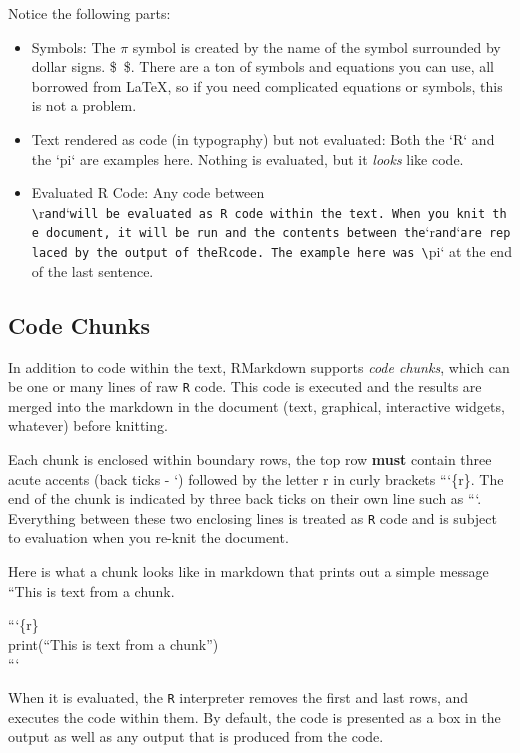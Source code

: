 \documentclass[
  letterpaper,
]{book}
\providecommand{\tightlist}{%
  \setlength{\itemsep}{0pt}\setlength{\parskip}{0pt}}
\begin{document}
Notice the following parts:

\begin{itemize}
\tightlist
\item
  Symbols: The \(\pi\) symbol is created by the name of the symbol
  surrounded by dollar signs. \$~\pi \$. There are a ton of symbols and
  equations you can use, all borrowed from LaTeX, so if you need
  complicated equations or symbols, this is not a problem.
\item
  Text rendered as code (in typography) but not evaluated: Both the `R`
  and the `pi` are examples here. Nothing is evaluated, but it
  \emph{looks} like code.
\item
  Evaluated R Code: Any code between
  \texttt{\textbackslash{}}r\texttt{and}`\texttt{will\ be\ evaluated\ as\ R\ code\ within\ the\ text.\ When\ you\ knit\ the\ document,\ it\ will\ be\ run\ and\ the\ contents\ between\ the}`r\texttt{and}`\texttt{are\ replaced\ by\ the\ output\ of\ the}R\texttt{code.\ The\ example\ here\ was\ \textbackslash{}}pi`
  at the end of the last sentence.
\end{itemize}

\subsection{Code Chunks}\label{code-chunks}

In addition to code within the text, RMarkdown supports \emph{code
chunks}, which can be one or many lines of raw \texttt{R} code. This
code is executed and the results are merged into the markdown in the
document (text, graphical, interactive widgets, whatever) before
knitting.

Each chunk is enclosed within boundary rows, the top row \textbf{must}
contain three acute accents (back ticks - `) followed by the letter r in
curly brackets ```\{r\}. The end of the chunk is indicated by three back
ticks on their own line such as ```. Everything between these two
enclosing lines is treated as \texttt{R} code and is subject to
evaluation when you re-knit the document.

Here is what a chunk looks like in markdown that prints out a simple
message ``This is text from a chunk.

```\{r\}\\
print(``This is text from a chunk'')\\
```

When it is evaluated, the \texttt{R} interpreter removes the first and
last rows, and executes the code within them. By default, the code is
presented as a box in the output as well as any output that is produced
from the code.
\end{document}
